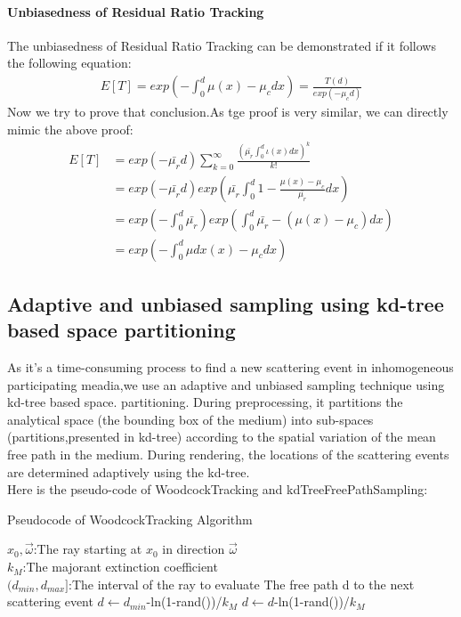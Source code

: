 \documentclass[acmtog]{acmart}
\begin{document}
\paragraph {\textbf{Unbiasedness of Residual Ratio Tracking}}
The unbiasedness of Residual Ratio Tracking can be demonstrated if it follows the following equation:
\begin{equation}
	\begin{aligned}
		E[T] = exp(-\int_{0}^{d}\mu(x)-\mu_cdx) = \frac{T(d)}{exp(-\mu_cd)}
	\end{aligned}
\end{equation}
Now we try to prove that conclusion.As tge proof is very similar, we can directly mimic the above proof:
\begin{equation}
	\begin{aligned}
		E[T]&=exp(-\bar{\mu_r}d)\sum_{k=0}^{\infty}\frac{(\bar{\mu_r}\int_{0}^{d}\iota(x)dx)^k}{k!}\\
		&=exp(-\bar{\mu_r}d)exp(\bar{\mu_r}\int_{0}^{d}1-\frac{\mu(x)-\mu_c}{\bar{\mu_r}}dx)\\
		&=exp(-\int_{0}^{d}\bar{\mu_r})exp(\int_{0}^{d}\bar{\mu_r}-(\mu(x)-\mu_c)dx)\\
		&=exp(-\int_{0}^{d}{\mu dx}(x)-\mu_cdx)
	\end{aligned}
\end{equation}
\subsection{Adaptive and unbiased sampling using kd-tree based space partitioning}
As it's a time-consuming process to find a new scattering event in inhomogeneous participating meadia,we use an adaptive and unbiased sampling technique using kd-tree based space. partitioning. During preprocessing, it partitions the analytical space (the bounding
box of the medium) into sub-spaces (partitions,presented in kd-tree) according to the spatial variation of the mean free path in the medium. During rendering, the locations
of the scattering events are determined adaptively using the kd-tree.
\\Here is the pseudo-code of WoodcockTracking and kdTreeFreePathSampling:
\begin{algorithm}[h]
	\caption{Pseudocode of WoodcockTracking Algorithm}
	\begin{algorithmic}[1]
		\Require
		$x_0,\vec{\omega}$:The ray starting at $x_0$ in direction $\vec{\omega}$\\
		$k_M$:The majorant extinction coefficient\\
		$(d_{min},d_{max}]$:The interval of the ray to evaluate
		\Ensure
		The free path d to the next scattering event
		\State $d\gets d_{min}$-ln(1-rand())/$k_M$ 
		\State $d\gets d$-ln(1-rand())/$k_M$ 
		\EndWhile
		\State {}
	\end{algorithmic}
\end{algorithm}\\
\end{document}

